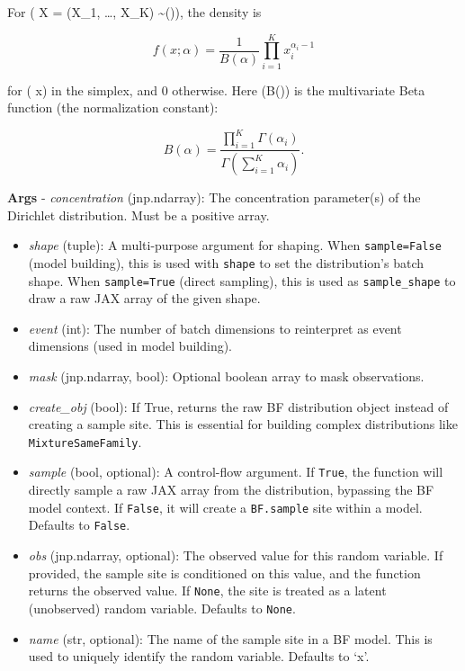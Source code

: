 \documentclass[
  letterpaper,
  DIV=11,
  numbers=noendperiod]{scrartcl}
\begin{document}
For ( X = (X\_1, \dots, X\_K) \sim {}(\alpha)), the density is

\[
f( x; \alpha) = \frac{1}{B(\alpha)} \prod_{i=1}^K x_i^{\alpha_i - 1}
\]

for ( x) in the simplex, and 0 otherwise. Here (B(\alpha)) is the
multivariate Beta function (the normalization constant):

\[
B(\alpha) = \frac{\prod_{i=1}^K \Gamma(\alpha_i)}{\Gamma\left(\sum_{i=1}^K \alpha_i\right)}.
\]

\textbf{Args} - \emph{concentration} (jnp.ndarray): The concentration
parameter(s) of the Dirichlet distribution. Must be a positive array.

\begin{itemize}
\item
  \emph{shape} (tuple): A multi-purpose argument for shaping. When
  \texttt{sample=False} (model building), this is used with
  \texttt{shape} to set the distribution's batch shape. When
  \texttt{sample=True} (direct sampling), this is used as
  \texttt{sample\_shape} to draw a raw JAX array of the given shape.
\item
  \emph{event} (int): The number of batch dimensions to reinterpret as
  event dimensions (used in model building).
\item
  \emph{mask} (jnp.ndarray, bool): Optional boolean array to mask
  observations.
\item
  \emph{create\_obj} (bool): If True, returns the raw BF distribution
  object instead of creating a sample site. This is essential for
  building complex distributions like \texttt{MixtureSameFamily}.
\item
  \emph{sample} (bool, optional): A control-flow argument. If
  \texttt{True}, the function will directly sample a raw JAX array from
  the distribution, bypassing the BF model context. If \texttt{False},
  it will create a \texttt{BF.sample} site within a model. Defaults to
  \texttt{False}.
\item
  \emph{obs} (jnp.ndarray, optional): The observed value for this random
  variable. If provided, the sample site is conditioned on this value,
  and the function returns the observed value. If \texttt{None}, the
  site is treated as a latent (unobserved) random variable. Defaults to
  \texttt{None}.
\item
  \emph{name} (str, optional): The name of the sample site in a BF
  model. This is used to uniquely identify the random variable. Defaults
  to `x'.
\end{itemize}
\end{document}
